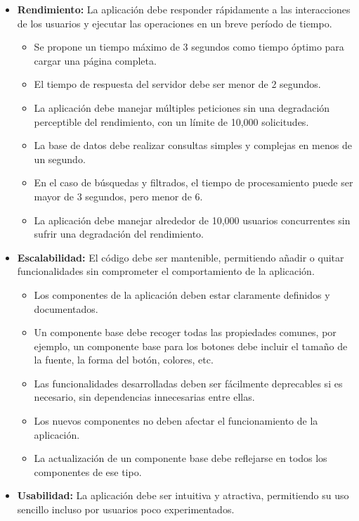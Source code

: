 \documentclass[a4paper, 12pt]{article}
\begin{document}
\begin{itemize}[noitemsep]
\item \textbf{Rendimiento:} La aplicación debe responder rápidamente a las interacciones de los usuarios y ejecutar las operaciones en un breve período de tiempo.
	\begin{itemize}[noitemsep]
	\item Se propone un tiempo máximo de 3 segundos como tiempo óptimo para cargar una página completa.
	\item El tiempo de respuesta del servidor debe ser menor de 2 segundos.
	\item La aplicación debe manejar múltiples peticiones sin una degradación perceptible del rendimiento, con un límite de 10,000 solicitudes.
	\item La base de datos debe realizar consultas simples y complejas en menos de un segundo.
	\item En el caso de búsquedas y filtrados, el tiempo de procesamiento puede ser mayor de 3 segundos, pero menor de 6.
	\item La aplicación debe manejar alrededor de 10,000 usuarios concurrentes sin sufrir una degradación del rendimiento.
	\end{itemize}
\item \textbf{Escalabilidad:} El código debe ser mantenible, permitiendo añadir o quitar funcionalidades sin comprometer el comportamiento de la aplicación.
	\begin{itemize}[noitemsep]
	\item Los componentes de la aplicación deben estar claramente definidos y documentados.
	\item Un componente base debe recoger todas las propiedades comunes, por ejemplo, un componente base para los botones debe incluir el tamaño de la fuente, la forma del botón, colores, etc.
	\item Las funcionalidades desarrolladas deben ser fácilmente deprecables si es necesario, sin dependencias innecesarias entre ellas.
	\item Los nuevos componentes no deben afectar el funcionamiento de la aplicación.
	\item La actualización de un componente base debe reflejarse en todos los componentes de ese tipo.
	\end{itemize}
\item \textbf{Usabilidad:} La aplicación debe ser intuitiva y atractiva, permitiendo su uso sencillo incluso por usuarios poco experimentados.
	\begin{itemize}[noitemsep]

\end{itemize}
\end{itemize}
\end{document}
